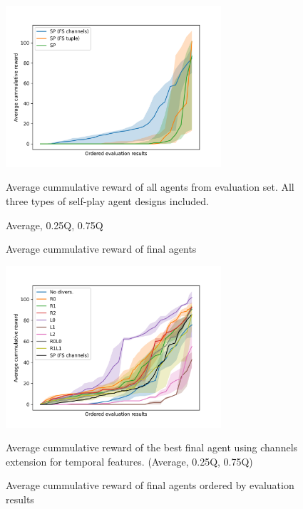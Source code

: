 \begin{figure}[!ht]
    \centering
    \includegraphics*[width=8cm]{../img/CounterCircuitFSVariantsOrderedAvg.png}

    \caption{Average cummulative reward of final agents}
    \label{CounterCircuitFSVariantsOrderedAvg}
    \medskip
    \small 
    Average cummulative reward of all agents from evaluation set.
    All three types of self-play agent designs included.

    Average, 0.25Q, 0.75Q

\end{figure}


\begin{figure}[!ht]
    \centering
    \includegraphics*[width=8cm]{../img/CounterCircuitFSChannelsOrderedQ15.png}

    \caption{Average cummulative reward of final agents ordered by evaluation results}
    \label{CounterCircuitFSChannelsOrderedQ15}
    \medskip
    \small 
    Average cummulative reward of the best final agent using channels extension for temporal features.    
    (Average, 0.25Q, 0.75Q)

\end{figure}


